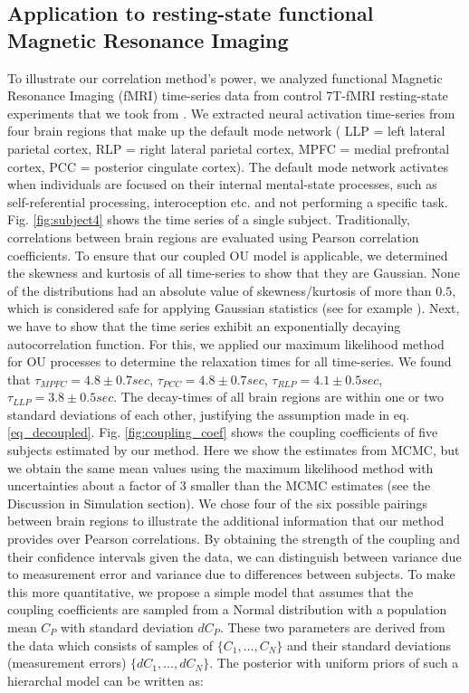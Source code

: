 \documentclass[%
 reprint,
 amsmath,amssymb,
 aps,
]{revtex4-1}
\begin{document}
\subsection{Application to resting-state functional Magnetic Resonance Imaging}
To illustrate our correlation method's power, we analyzed functional Magnetic Resonance Imaging (fMRI) time-series data from control 7T-fMRI resting-state experiments that we took from \cite{RN98}.  We extracted neural activation time-series from four brain regions that make up the default mode network \cite{RN99} ( LLP = left lateral parietal cortex, RLP = right lateral parietal cortex, MPFC = medial prefrontal cortex, PCC = posterior cingulate cortex).  The default mode network activates when individuals are focused on their internal mental-state processes, such as self-referential processing, interoception etc. and not performing a specific task.  Fig. \ref{fig:subject4} shows the time series of a single subject.  Traditionally, correlations between brain regions are evaluated using Pearson correlation coefficients.  To ensure that our coupled OU model is applicable, we determined the skewness and kurtosis of all time-series to show that they are Gaussian.  None of the distributions had an absolute value of skewness/kurtosis of more than $0.5$, which is considered safe for applying Gaussian statistics (see for example \cite{RN100}).  Next, we have to show that the time series exhibit an exponentially decaying autocorrelation function.  For this, we applied our maximum likelihood method for OU processes to determine the relaxation times for all time-series.  We found that $\tau_{MPFC}=4.8 \pm 0.7 sec$, $\tau_{PCC}=4.8 \pm 0.7 sec$, $\tau_{RLP}=4.1 \pm 0.5 sec$, $\tau_{LLP}=3.8 \pm 0.5 sec$.  The decay-times of all brain regions are within one or two standard deviations of each other, justifying the assumption made in eq. \ref{eq_decoupled}.
Fig. \ref{fig:coupling_coef} shows the coupling coefficients of five subjects estimated by our method.  Here we show the estimates from MCMC, but we obtain the same mean values using the maximum likelihood method with uncertainties about a factor of 3 smaller than the MCMC estimates (see the Discussion in Simulation section).  We chose four of the six possible pairings between brain regions to illustrate the additional information that our method provides over Pearson correlations.  By obtaining the strength of the coupling and their confidence intervals given the data, we can distinguish between variance due to measurement error and variance due to differences between subjects.  To make this more quantitative, we propose a simple model that assumes that the coupling coefficients are sampled from a Normal distribution with a population mean $C_{P}$ with standard deviation $dC_P$.  These two parameters are derived from the data which consists of samples of $\{C_{1},\dots,C_{N}\}$ and their standard deviations (measurement errors) $\{dC_{1},\dots,dC_{N}\}$.  The posterior with uniform priors of such a hierarchal model can be written as:
\end{document}
